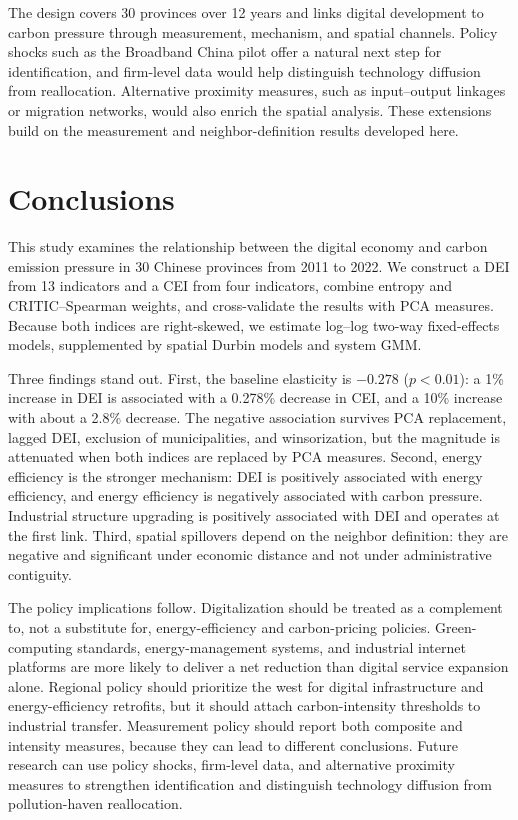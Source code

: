 \documentclass[economies,article,submit,moreauthors]{Definitions/mdpi}
\begin{document}
The design covers 30 provinces over 12 years and links digital development to carbon pressure through measurement, mechanism, and spatial channels. Policy shocks such as the Broadband China pilot \citep{xiao2024,lim2025} offer a natural next step for identification, and firm-level data would help distinguish technology diffusion from reallocation. Alternative proximity measures, such as input--output linkages or migration networks, would also enrich the spatial analysis. These extensions build on the measurement and neighbor-definition results developed here.

\section{Conclusions}

This study examines the relationship between the digital economy and carbon emission pressure in 30 Chinese provinces from 2011 to 2022. We construct a DEI from 13 indicators and a CEI from four indicators, combine entropy and CRITIC--Spearman weights, and cross-validate the results with PCA measures. Because both indices are right-skewed, we estimate log--log two-way fixed-effects models, supplemented by spatial Durbin models and system GMM.

Three findings stand out. First, the baseline elasticity is $-0.278$ ($p<0.01$): a 1\% increase in DEI is associated with a 0.278\% decrease in CEI, and a 10\% increase with about a 2.8\% decrease. The negative association survives PCA replacement, lagged DEI, exclusion of municipalities, and winsorization, but the magnitude is attenuated when both indices are replaced by PCA measures. Second, energy efficiency is the stronger mechanism: DEI is positively associated with energy efficiency, and energy efficiency is negatively associated with carbon pressure. Industrial structure upgrading is positively associated with DEI and operates at the first link. Third, spatial spillovers depend on the neighbor definition: they are negative and significant under economic distance and not under administrative contiguity.

The policy implications follow. Digitalization should be treated as a complement to, not a substitute for, energy-efficiency and carbon-pricing policies. Green-computing standards, energy-management systems, and industrial internet platforms are more likely to deliver a net reduction than digital service expansion alone. Regional policy should prioritize the west for digital infrastructure and energy-efficiency retrofits, but it should attach carbon-intensity thresholds to industrial transfer. Measurement policy should report both composite and intensity measures, because they can lead to different conclusions. Future research can use policy shocks, firm-level data, and alternative proximity measures to strengthen identification and distinguish technology diffusion from pollution-haven reallocation.
\end{document}

